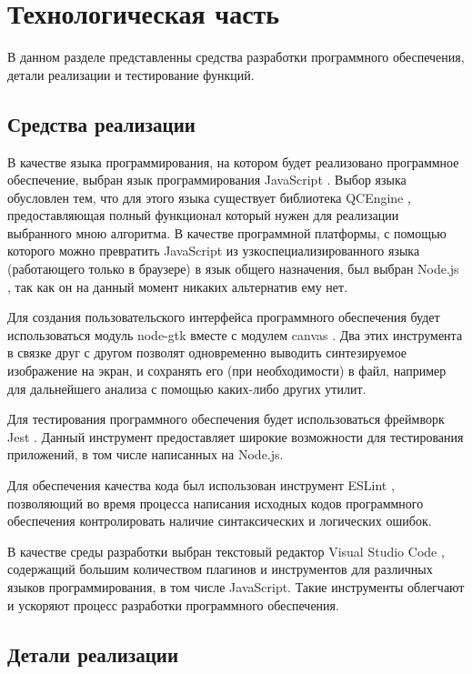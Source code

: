 \chapter{Технологическая часть}

В данном разделе представленны средства разработки программного обеспечения, детали реализации и тестирование функций.

\section{Средства реализации}

В качестве языка программирования, на котором будет реализовано программное обеспечение, выбран язык программирования JavaScript \cite{js}. Выбор языка обусловлен тем, что для этого языка существует библиотека QCEngine \cite{qcengine}, предоставляющая полный функционал который нужен для реализации выбранного мною алгоритма. В качестве программной платформы, с помощью которого можно превратить JavaScript из узкоспециализированного языка (работающего только в браузере) в язык общего назначения, был выбран Node.js \cite{nodejs}, так как он на данный момент никаких альтернатив ему нет.

Для создания пользовательского интерфейса программного обеспечения будет использоваться модуль node-gtk \cite{node-gtk} вместе с модулем canvas \cite{node-canvas}. Два этих инструмента в связке друг с другом позволят одновременно выводить синтезируемое изображение на экран, и сохранять его (при необходимости) в файл, например для дальнейшего анализа с помощью каких-либо других утилит.

Для тестирования программного обеспечения будет использоваться фреймворк Jest \cite{jest}. Данный инструмент предоставляет широкие возможности для тестирования приложений, в том числе написанных на Node.js.

Для обеспечения качества кода был использован инструмент ESLint \cite{eslint}, позволяющий во время процесса написания исходных кодов программного обеспечения контролировать наличие синтаксических и логических ошибок.

В качестве среды разработки выбран текстовый редактор Visual Studio Code \cite{vscode}, содержащий большим количеством плагинов и инструментов для различных языков программирования, в том числе JavaScript. Такие инструменты облегчают и ускоряют процесс разработки программного обеспечения.

\section{Детали реализации}

